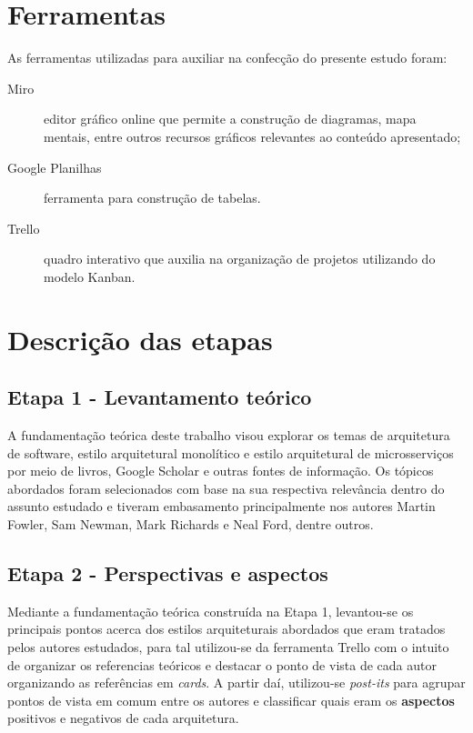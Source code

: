 \section{Ferramentas}

As ferramentas utilizadas para auxiliar na confecção do presente estudo foram:

\begin{description}
    \item[Miro] editor gráfico online que permite a construção de diagramas, mapa mentais, entre
        outros recursos gráficos relevantes ao conteúdo apresentado;
    \item[Google Planilhas] ferramenta para construção de tabelas.
    \item[Trello] quadro interativo que auxilia na organização de projetos utilizando do modelo
        Kanban.
\end{description}

\section{Descrição das etapas}
\subsection{Etapa 1 - Levantamento teórico}

A fundamentação teórica deste trabalho visou explorar os temas de arquitetura de software,
estilo arquitetural monolítico e estilo arquitetural de microsserviços por meio de livros, Google Scholar e
outras fontes de informação. Os tópicos abordados foram selecionados com base na sua respectiva
relevância dentro do assunto estudado e tiveram embasamento principalmente nos autores Martin Fowler,
Sam Newman, Mark Richards e Neal Ford, dentre outros.

\subsection{Etapa 2 - Perspectivas e aspectos}
\label{met:perspectivas}

Mediante a fundamentação teórica construída na Etapa 1, levantou-se os principais pontos acerca dos
estilos arquiteturais abordados que eram tratados pelos autores estudados, para tal utilizou-se da
ferramenta Trello com o intuito de organizar os referencias teóricos e destacar o ponto de vista de
cada autor organizando as referências em \textit{cards}. A partir daí, utilizou-se \textit{post-its}
para agrupar pontos de vista em comum entre os autores e classificar quais eram os \textbf{aspectos}
positivos e negativos de cada arquitetura.

